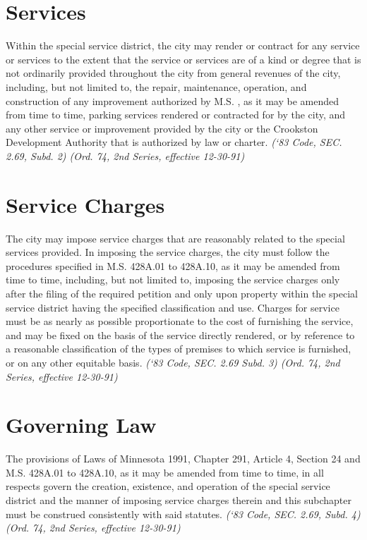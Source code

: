 \section{Services}
Within the special service district, the city may render or contract for any service or services to the extent that the service or services are of a kind or degree that is not ordinarily provided throughout the city from general revenues of the city, including, but not limited to, the repair, maintenance, operation, and construction of any improvement authorized by M.S. , as it may be amended from time to time, parking services rendered or contracted for by the city, and any other service or improvement provided by the city or the Crookston Development Authority that is authorized by law or charter.\newline
\emph{(‘83 Code, SEC. 2.69, Subd. 2)  (Ord. 74, 2nd Series, effective 12-30-91)}
\section{Service Charges}
The city may impose service charges that are reasonably related to the special services provided.  In imposing the service charges, the city must follow the procedures specified in M.S. \textsection 428A.01 to \textsection 428A.10, as it may be amended from time to time, including, but not limited to, imposing the service charges only after the filing of the required petition and only upon property within the special service district having the specified classification and use.  Charges for service must be as nearly as possible proportionate to the cost of furnishing the service, and may be fixed on the basis of the service directly rendered, or by reference to a reasonable classification of the types of premises to which service is furnished, or on any other equitable basis.\newline
\emph{(‘83 Code, SEC. 2.69 Subd. 3)  (Ord. 74, 2nd Series, effective 12-30-91)}
\section{Governing Law}
The provisions of Laws of Minnesota 1991, Chapter 291, Article 4, Section 24 and M.S. \textsection 428A.01 to \textsection 428A.10, as it may be amended from time to time, in all respects govern the creation, existence, and operation of the special service district and the manner of imposing service charges therein and this subchapter must be construed consistently with said statutes.\newline
\emph{(‘83 Code, SEC. 2.69, Subd. 4)  (Ord. 74, 2nd Series, effective 12-30-91)}



%
